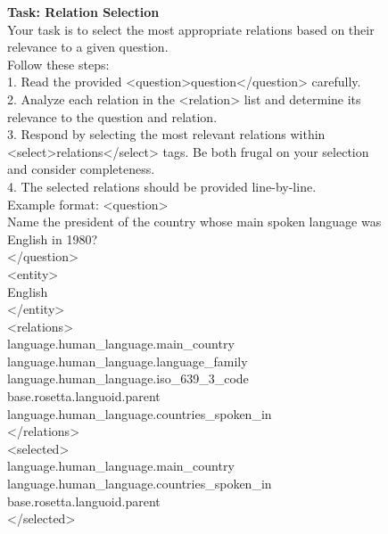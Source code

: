 
\begin{figure}
\begin{minipage}{1\columnwidth}
    \centering
\begin{tcolorbox}[title=Relation Selection Prompt]
        \small
        \vspace{10pt}
        \textbf{Task: Relation Selection} \\
Your task is to select the most appropriate relations based on their relevance to a given question.  \\



    Follow these steps: \\
    1. Read the provided <question>question</question> carefully. \\
    2. Analyze each relation in the <relation> list and determine its relevance to the question and relation. \\
    3. Respond by selecting the most relevant relations within <select>relations</select> tags. Be both frugal on your selection and consider completeness. \\
    4. The selected relations should be provided line-by-line. \\
    

    Example format:
    <question> \\
    Name the president of the country whose main spoken language was English in 1980? \\
    </question> \\

    <entity> \\
    English \\
    </entity> \\
 
    <relations> \\
    language.human\_language.main\_country \\
    language.human\_language.language\_family \\
    language.human\_language.iso\_639\_3\_code \\
    base.rosetta.languoid.parent \\
    language.human\_language.countries\_spoken\_in \\
    </relations> \\

    <selected> \\
    language.human\_language.main\_country \\
    language.human\_language.countries\_spoken\_in \\
    base.rosetta.languoid.parent \\
    </selected> \\


\end{tcolorbox}
\end{minipage}
\end{figure}
